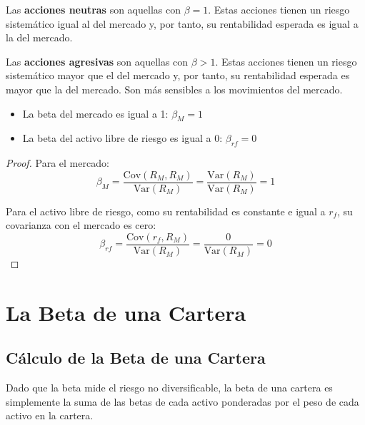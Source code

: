 \begin{definicion}
Las \textbf{acciones neutras} son aquellas con $\beta = 1$. Estas acciones tienen un riesgo sistemático igual al del mercado y, por tanto, su rentabilidad esperada es igual a la del mercado.
\end{definicion}

\begin{definicion}
Las \textbf{acciones agresivas} son aquellas con $\beta > 1$. Estas acciones tienen un riesgo sistemático mayor que el del mercado y, por tanto, su rentabilidad esperada es mayor que la del mercado. Son más sensibles a los movimientos del mercado.
\end{definicion}

\begin{proposicion}
\begin{itemize}
\item La beta del mercado es igual a 1: $\beta_M = 1$
\item La beta del activo libre de riesgo es igual a 0: $\beta_{rf} = 0$
\end{itemize}
\end{proposicion}

\begin{proof}
Para el mercado:
\begin{equation}
\beta_M = \frac{\text{Cov}(R_M, R_M)}{\text{Var}(R_M)} = \frac{\text{Var}(R_M)}{\text{Var}(R_M)} = 1
\end{equation}

Para el activo libre de riesgo, como su rentabilidad es constante e igual a $r_f$, su covarianza con el mercado es cero:
\begin{equation}
\beta_{rf} = \frac{\text{Cov}(r_f, R_M)}{\text{Var}(R_M)} = \frac{0}{\text{Var}(R_M)} = 0
\end{equation}
\end{proof}

\section{La Beta de una Cartera}

\subsection{Cálculo de la Beta de una Cartera}

Dado que la beta mide el riesgo no diversificable, la beta de una cartera es simplemente la suma de las betas de cada activo ponderadas por el peso de cada activo en la cartera.

